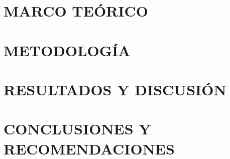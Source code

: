 \documentclass{tesis}
\begin{document}



\setcounter{page}{2}











\newpage
\renewcommand{\thepage}{\arabic{page}}%
\setcounter{page}{1}
\chapter{MARCO TEÓRICO}\label{ch:marco-teorico}








\chapter{METODOLOGÍA}\label{ch:metodologia}



\chapter{RESULTADOS Y DISCUSIÓN}\label{ch:resultados-y-discusion}






\chapter{CONCLUSIONES Y RECOMENDACIONES}\label{ch:conclusiones-y-recomendaciones}





\end{document}
